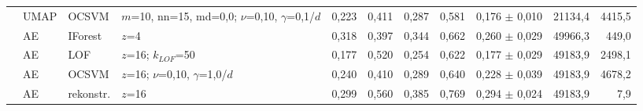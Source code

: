 \begin{longtable}{lllL{2.7cm}rrrrrrr}
 & UMAP & OCSVM & $m$=10, nn=15, md=0,0; $\nu$=0,10, $\gamma$=0,1/$d$ & 0,223 & 0,411 & 0,287 & 0,581 & 0,176 $\pm$ 0,010 & 21134,4 & 4415,5 \\
 & AE & IForest & $z$=4 & 0,318 & 0,397 & 0,344 & 0,662 & 0,260 $\pm$ 0,029 & 49966,3 & 449,0 \\
 & AE & LOF & $z$=16; $k_{LOF}$=50 & 0,177 & 0,520 & 0,254 & 0,622 & 0,177 $\pm$ 0,029 & 49183,9 & 2498,1 \\
 & AE & OCSVM & $z$=16; $\nu$=0,10, $\gamma$=1,0/$d$ & 0,240 & 0,410 & 0,289 & 0,640 & 0,228 $\pm$ 0,039 & 49183,9 & 4678,2 \\
 & AE & rekonstr. & $z$=16 & 0,299 & 0,560 & 0,385 & 0,769 & 0,294 $\pm$ 0,024 & 49183,9 & 7,9 \\
\bottomrule
\end{longtable}

